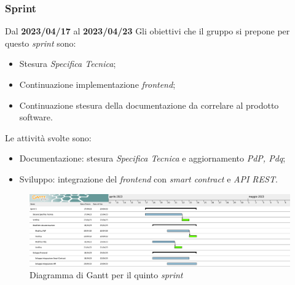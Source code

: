 \subsubsection{ Sprint}
Dal \textbf{2023/04/17} al \textbf{2023/04/23}
\newline
Gli obiettivi che il gruppo si prepone per questo \textit{sprint} sono:
\begin{itemize}
    \item Stesura \textit{Specifica Tecnica};
    \item Continuazione implementazione \textit{frontend};
    \item Continuazione stesura della documentazione da correlare al prodotto software.
\end{itemize}
Le attività svolte sono:
\begin{itemize}
    \item Documentazione: stesura \textit{Specifica Tecnica} e aggiornamento \textit{PdP, Pdq};
    \item Sviluppo: integrazione del \textit{frontend} con \textit{smart contract} e \textit{API REST}.
\end{itemize}
\begin{figure}[H]
    \centering
    \includegraphics[width=\textwidth]{src/img/Sprint 5.png}
    \caption{Diagramma di Gantt per il quinto \textit{sprint}}
\end{figure}
